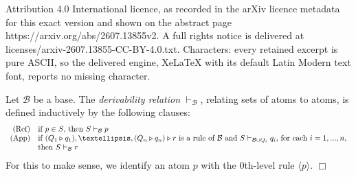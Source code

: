 \documentclass[10pt,a4paper]{amsart}
\newcommand{\base}[1]{\mathcal{#1}}                    %
\newcommand{\brule}[1]{\triangleright{#1}}         %
\newcommand{\deriv}[1]{\vdash_{#1}}       %
\newcommand{\fillBox}{\hfill$\Box$}
\begin{document}
Attribution 4.0 International licence, as recorded in the arXiv licence metadata for this exact version and shown on the abstract page https://arxiv.org/abs/2607.13855v2. A full rights notice is delivered at licenses/arxiv-2607.13855-CC-BY-4.0.txt. Characters: every retained excerpt is pure ASCII, so the delivered engine, XeLaTeX with its default Latin Modern text font, reports no missing character.
\begin{definition}
\label{def:derivability-in-a-base}
Let $\base{B}$ be a base. The \emph{derivability relation} $\deriv{\base{B}}$,
relating sets of atoms to atoms, is defined
inductively by the following clauses:
\[
\begin{array}{rl}
    \mbox{\rm (Ref)} & \mbox{if $p \in S$, then $S \deriv{\base{B}} p$} \\
    \mbox{\rm (App)} & \mbox{if $(Q_1 \brule q_1), \ldots, (Q_n \brule q_n)
        \brule r$ is a rule of $\base{B}$ and
        $S \deriv{\base{B} \cup Q_i} q_i$, for each $i = 1,...,n$,} \\
        & \mbox{then $S \deriv{\base{B}} r$}
\end{array}
\]
For this to make sense, we identify an atom $p$ with the
$0$th-level rule $\langle p \rangle$. \fillBox
\end{definition}
\end{document}
